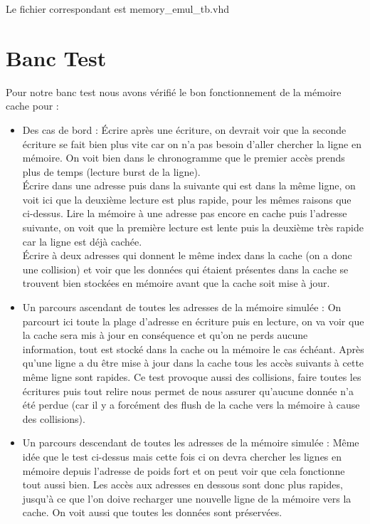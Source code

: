 \documentclass[10pt,a4paper]{article}
\begin{document}
Le fichier correspondant est memory\_emul\_tb.vhd 
\section{Banc Test}
Pour notre banc test nous avons vérifié le bon fonctionnement de la mémoire cache pour :\\
\begin{itemize}
\item Des cas de bord :
Écrire après une écriture, on devrait voir que la seconde écriture se fait bien plus vite car on n'a pas besoin d'aller chercher la ligne en mémoire. On voit bien dans le chronogramme que le premier accès prends plus de temps (lecture burst de la ligne).\\
Écrire dans une adresse puis dans la suivante qui est dans la même ligne, on voit ici que la deuxième lecture est plus rapide, pour les mêmes raisons que ci-dessus.
Lire la mémoire à une adresse pas encore en cache puis l'adresse suivante, on voit que la première lecture est lente puis la deuxième très rapide car la ligne est déjà cachée.\\
Écrire à deux adresses qui donnent le même index dans la cache (on a donc une collision) et voir que les données qui étaient présentes dans la cache se trouvent bien stockées en mémoire avant que la cache soit mise à jour.\\

\item Un parcours ascendant de toutes les adresses de la mémoire simulée :
On parcourt ici toute la plage d'adresse en écriture puis en lecture, on va voir que la cache sera mis à jour en conséquence et qu'on ne perds aucune information, tout est stocké dans la cache ou la mémoire le cas échéant. Après qu'une ligne a du être mise à jour dans la cache tous les accès suivants à cette même ligne sont rapides. Ce test provoque aussi des collisions, faire toutes les écritures puis tout relire nous permet de nous assurer qu'aucune donnée n'a été perdue (car il y a forcément des flush de la cache vers la mémoire à cause des collisions).\\

\item Un parcours descendant de toutes les adresses de la mémoire simulée :
Même idée que le test ci-dessus mais cette fois ci on devra chercher les lignes en mémoire depuis l'adresse de poids fort et on peut voir que cela fonctionne tout aussi bien. Les accès aux adresses en dessous sont donc plus rapides, jusqu'à ce que l'on doive recharger une nouvelle ligne de la mémoire vers la cache. On voit aussi que toutes les données sont préservées.\\


\end{itemize}
\end{document}
